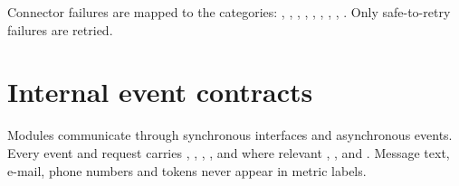\noindent Connector failures are mapped to the categories: , , , , , , , , . Only safe-to-retry failures are retried.

\section{Internal event contracts}
Modules communicate through synchronous interfaces and asynchronous events. Every event and request carries , , , , and where relevant , ,  and . Message text, e-mail, phone numbers and tokens never appear in metric labels.
